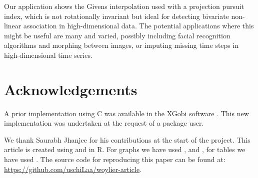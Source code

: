 Our application shows the Givens interpolation used with a projection pursuit index, which is not rotationally invariant but ideal for detecting bivariate non-linear association in high-dimensional data. The potential applications where this might be useful are many and varied, possibly including facial recognition algorithms and morphing between images, or imputing missing time steps in high-dimensional time series.

\section*{Acknowledgements}\label{acknowledgements}

A prior implementation using C was available in the XGobi software \citep{xgobi}. This new implementation was undertaken at the request of a  package user.

We thank Saurabh Jhanjee for his contributions at the start of the project. This article is created using  \citep{knitr} and  \citep{rmarkdown, rmarkdown-book, rmarkdown-book2} in R. For graphs we have used  \citep{ggplot2},  \citep{cowplot} and  \citep{ggally}, for tables we have used  \citep{kableextra}. The source code for reproducing this paper can be found at: \url{https://github.com/uschiLaa/woylier-article}.



\address{%
Zoljargal Batsaikhan\\
Monash University\\%
Department of Econometrics and Business Statistics\\ Clayton, VIC, Australia\\
%
\url{https://github.com/zolabat}\\%
\textit{ORCiD: \href{https://orcid.org/0009-0005-0055-1448}{0009-0005-0055-1448}}\\%
\href{mailto:zoljargal11@gmail.com}{\nolinkurl{zoljargal11@gmail.com}}%
}

\address{%
Dianne Cook\\
Monash University\\%
Department of Econometrics and Business Statistics\\ Clayton, VIC, Australia\\
%
\url{http://www.dicook.org}\\%
\textit{ORCiD: \href{https://orcid.org/0000-0002-3813-7155}{0000-0002-3813-7155}}\\%
\href{mailto:dicook@monash.edu}{\nolinkurl{dicook@monash.edu}}%
}

\address{%
Ursula Laa\\
University of Natural Resources and Life Sciences Vienna\\%
Institute of Statistics\\ Vienna, Austria\\
%
\url{https://uschilaa.github.io}\\%
\textit{ORCiD: \href{https://orcid.org/0000-0002-0249-6439}{0000-0002-0249-6439}}\\%
\href{mailto:ursula.laa@boku.ac.at}{\nolinkurl{ursula.laa@boku.ac.at}}%
}
